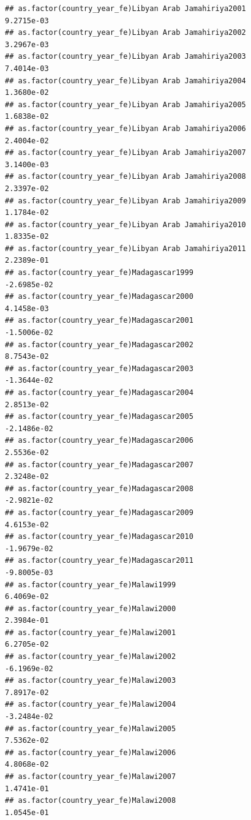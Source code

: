 \documentclass[
  a4paper,
]{article}
\begin{document}
\begin{verbatim}
## as.factor(country_year_fe)Libyan Arab Jamahiriya2001            9.2715e-03
## as.factor(country_year_fe)Libyan Arab Jamahiriya2002            3.2967e-03
## as.factor(country_year_fe)Libyan Arab Jamahiriya2003            7.4014e-03
## as.factor(country_year_fe)Libyan Arab Jamahiriya2004            1.3680e-02
## as.factor(country_year_fe)Libyan Arab Jamahiriya2005            1.6838e-02
## as.factor(country_year_fe)Libyan Arab Jamahiriya2006            2.4004e-02
## as.factor(country_year_fe)Libyan Arab Jamahiriya2007            3.1400e-03
## as.factor(country_year_fe)Libyan Arab Jamahiriya2008            2.3397e-02
## as.factor(country_year_fe)Libyan Arab Jamahiriya2009            1.1784e-02
## as.factor(country_year_fe)Libyan Arab Jamahiriya2010            1.8335e-02
## as.factor(country_year_fe)Libyan Arab Jamahiriya2011            2.2389e-01
## as.factor(country_year_fe)Madagascar1999                       -2.6985e-02
## as.factor(country_year_fe)Madagascar2000                        4.1458e-03
## as.factor(country_year_fe)Madagascar2001                       -1.5006e-02
## as.factor(country_year_fe)Madagascar2002                        8.7543e-02
## as.factor(country_year_fe)Madagascar2003                       -1.3644e-02
## as.factor(country_year_fe)Madagascar2004                        2.8513e-02
## as.factor(country_year_fe)Madagascar2005                       -2.1486e-02
## as.factor(country_year_fe)Madagascar2006                        2.5536e-02
## as.factor(country_year_fe)Madagascar2007                        2.3248e-02
## as.factor(country_year_fe)Madagascar2008                       -2.9821e-02
## as.factor(country_year_fe)Madagascar2009                        4.6153e-02
## as.factor(country_year_fe)Madagascar2010                       -1.9679e-02
## as.factor(country_year_fe)Madagascar2011                       -9.8005e-03
## as.factor(country_year_fe)Malawi1999                            6.4069e-02
## as.factor(country_year_fe)Malawi2000                            2.3984e-01
## as.factor(country_year_fe)Malawi2001                            6.2705e-02
## as.factor(country_year_fe)Malawi2002                           -6.1969e-02
## as.factor(country_year_fe)Malawi2003                            7.8917e-02
## as.factor(country_year_fe)Malawi2004                           -3.2484e-02
## as.factor(country_year_fe)Malawi2005                            7.5362e-02
## as.factor(country_year_fe)Malawi2006                            4.8068e-02
## as.factor(country_year_fe)Malawi2007                            1.4741e-01
## as.factor(country_year_fe)Malawi2008                            1.0545e-01

\end{verbatim}
\end{document}
